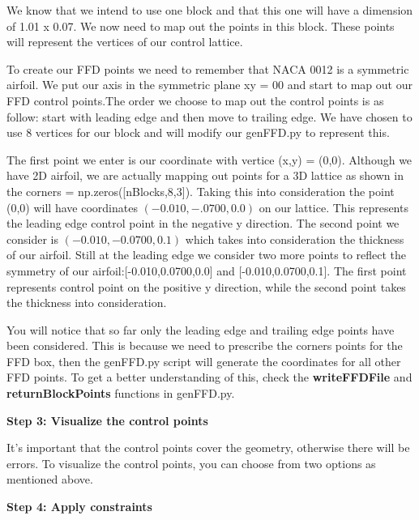 \documentclass[12pt]{article}
\begin{document}
\noindent We know that we intend to use one block and that this one will have a dimension of 1.01 x 0.07. We now need to map out the points in this block. These points will represent the vertices of our control lattice. \vspace{4mm}

\noindent To create our FFD points we need to remember that NACA 0012 is a symmetric airfoil. We put our axis in the symmetric plane xy = 00 and start to map out our FFD control points.The order we choose to map out the control points is as follow: start with leading edge and then move to trailing edge. We have chosen to use 8 vertices for our block and will modify our genFFD.py to represent this.\vspace{4mm}  

\noindent The first point we enter is our coordinate with vertice (x,y) = (0,0). Although we have 2D airfoil, we are actually mapping out points for a 3D lattice as shown in the corners = np.zeros([nBlocks,8,3]). Taking this into consideration the point (0,0) will have coordinates $(-0.010,-.0700,0.0)$ on our lattice. This represents the leading edge control point in the negative y direction. The second point we consider is $(-0.010,-0.0700,0.1)$ which takes into consideration the thickness of our airfoil. Still at the leading edge we consider two more points to reflect the symmetry of our airfoil:[-0.010,0.0700,0.0] and [-0.010,0.0700,0.1]. The first point represents control point on the positive y direction, while the second point takes the thickness into consideration.\vspace{4mm} 

\noindent You will notice that so far only the leading edge and trailing edge points have been considered. This is because we need to prescribe the corners points for the FFD box, then the genFFD.py script will generate the coordinates for all other FFD points. To get a better understanding of this, check the \textbf{writeFFDFile} and \textbf{returnBlockPoints} functions in genFFD.py. \vspace{4mm}

\noindent \textbf{Step 3: Visualize the control points}

\noindent It's important that the control points cover the geometry, otherwise there will be errors. To visualize the control points, you can choose from two options as mentioned above. \vspace{4mm} 

\noindent \textbf{Step 4: Apply constraints}
 
\end{document}
